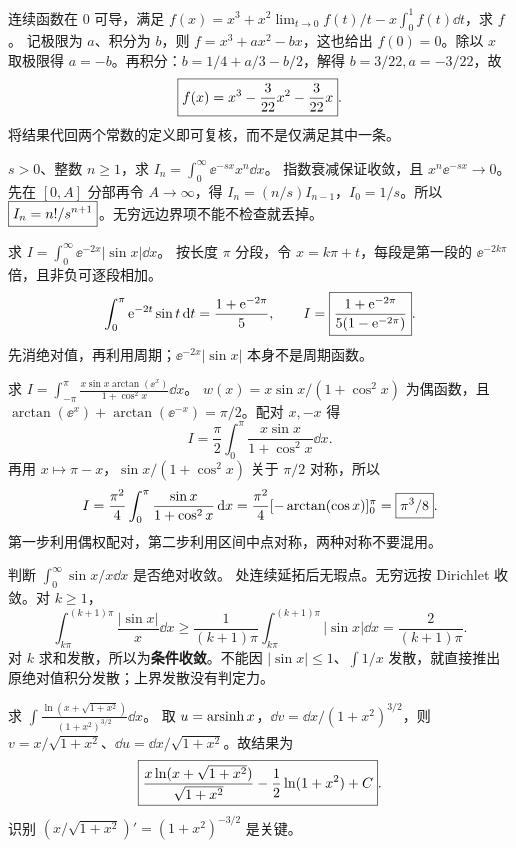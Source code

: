 连续函数在 0 可导，满足 $f(x)=x^3+x^2\lim_{t\to0}f(t)/t-x\int_0^1f(t)\dd t$，求 $f$。
\sol 记极限为 $a$、积分为 $b$，则 $f=x^3+ax^2-bx$，这也给出 $f(0)=0$。除以 $x$ 取极限得 $a=-b$。再积分：$b=1/4+a/3-b/2$，解得 $b=3/22,a=-3/22$，故
\[\boxed{f(x)=x^3-\frac3{22}x^2-\frac3{22}x}.\]
将结果代回两个常数的定义即可复核，而不是仅满足其中一条。

$s>0$、整数 $n\ge1$，求 $I_n=\int_0^\infty\ee^{-sx}x^n\dd x$。
\sol 指数衰减保证收敛，且 $x^n\ee^{-sx}\to0$。先在 $[0,A]$ 分部再令 $A\to\infty$，得 $I_n=(n/s)I_{n-1}$，$I_0=1/s$。所以 $\boxed{I_n=n!/s^{n+1}}$。无穷远边界项不能不检查就丢掉。

求 $I=\int_0^\infty\ee^{-2x}|\sin x|\dd x$。
\sol 按长度 $\pi$ 分段，令 $x=k\pi+t$，每段是第一段的 $\ee^{-2k\pi}$ 倍，且非负可逐段相加。
\[
\int_0^\pi\mathrm e^{-2t}\sin t\,\mathrm d t=\frac{1+\mathrm e^{-2\pi}}5,\qquad
I=\boxed{\frac{1+\mathrm e^{-2\pi}}{5(1-\mathrm e^{-2\pi})}}.
\]
先消绝对值，再利用周期；$\ee^{-2x}|\sin x|$ 本身不是周期函数。

求 $I=\int_{-\pi}^{\pi}\frac{x\sin x\arctan(\ee^x)}{1+\cos^2x}\dd x$。
\sol $w(x)=x\sin x/(1+\cos^2x)$ 为偶函数，且 $\arctan(\ee^x)+\arctan(\ee^{-x})=\pi/2$。配对 $x,-x$ 得
\[I=\frac\pi2\int_0^\pi\frac{x\sin x}{1+\cos^2x}\dd x.\]
再用 $x\mapsto\pi-x$，$\sin x/(1+\cos^2x)$ 关于 $\pi/2$ 对称，所以
\[I=\frac{\pi^2}4\int_0^\pi\frac{\sin x}{1+\cos^2x}\,\mathrm d x
=\frac{\pi^2}4[-\arctan(\cos x)]_0^\pi=\boxed{\pi^3/8}.\]
第一步利用偶权配对，第二步利用区间中点对称，两种对称不要混用。

判断 $\int_0^\infty\sin x/x\dd x$ 是否绝对收敛。
 处连续延拓后无瑕点。无穷远按 Dirichlet 收敛。对 $k\ge1$，
\[\int_{k\pi}^{(k+1)\pi}\frac{|\sin x|}x\dd x
\ge\frac1{(k+1)\pi}\int_{k\pi}^{(k+1)\pi}|\sin x|\dd x
=\frac2{(k+1)\pi}.\]
对 $k$ 求和发散，所以为\textbf{条件收敛}。不能因 $|\sin x|\le1$、$\int1/x$ 发散，就直接推出原绝对值积分发散；上界发散没有判定力。

求 $\int\frac{\ln(x+\sqrt{1+x^2})}{(1+x^2)^{3/2}}\dd x$。
\sol 取 $u=\operatorname{arsinh} x$，$\dd v=\dd x/(1+x^2)^{3/2}$，则 $v=x/\sqrt{1+x^2}$、$\dd u=\dd x/\sqrt{1+x^2}$。故结果为
\[\boxed{\frac{x\ln(x+\sqrt{1+x^2})}{\sqrt{1+x^2}}-\frac12\ln(1+x^2)+C}.\]
识别 $(x/\sqrt{1+x^2})'=(1+x^2)^{-3/2}$ 是关键。

